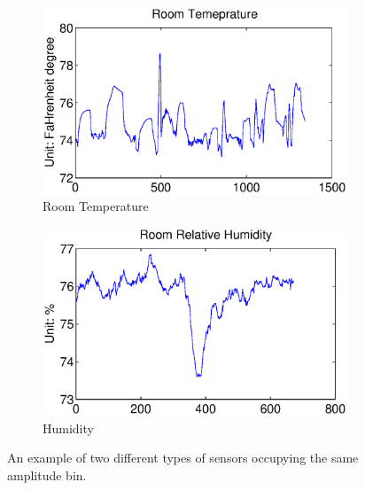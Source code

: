 \begin{figure}[ht!]
\centering
  \begin{subfigure}{0.22\textwidth}
                \centering
    \includegraphics[width=\textwidth]{./fig/rmt_ex.eps}
                \caption{Room Temperature}
  \end{subfigure}
  \begin{subfigure}{0.22\textwidth}
                \centering
    \includegraphics[width=\textwidth]{./fig/rh_ex.eps}
                \caption{Humidity}
  \end{subfigure}
\caption{An example of two different types of sensors occupying the same amplitude bin.}
\label{fig:same_bin}
\end{figure}


